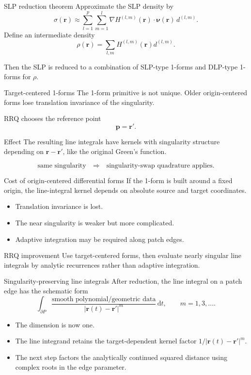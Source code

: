 \documentclass[aspectratio=169,11pt]{beamer}
\newcommand{\dd}{\,\mathrm d}
\newcommand{\rvec}{\bm{r}}
\newcommand{\rp}{\bm{r}'}
\newcommand{\nuvec}{\bm{\nu}}
\begin{document}
\begin{frame}{SLP reduction theorem}
\small
Approximate the SLP density by
\[
  \sigma(\rvec)
  \approx
  \sum_{l=1}^p\sum_{m=1}^l
  \nabla H^{(l,m)}(\rvec)\cdot\nuvec(\rvec)\,d^{(l,m)}.
\]
Define an intermediate density
\[
  \rho(\rvec)=\sum_{l,m}H^{(l,m)}(\rvec)d^{(l,m)}.
\]

Then the SLP is reduced to a combination of SLP-type 1-forms and DLP-type
1-forms for $\rho$.
\end{frame}

\begin{frame}{Target-centered 1-forms}
\small
The 1-form primitive is not unique. Older origin-centered forms lose translation
invariance of the singularity.

RRQ chooses the reference point
\[
  \bm p=\rp.
\]

\begin{block}{Effect}
The resulting line integrals have kernels with singularity structure depending
on $\rvec-\rp$, like the original Green's function.
\end{block}
\[
  \text{same singularity}
  \quad\Longrightarrow\quad
  \text{singularity-swap quadrature applies.}
\]
\end{frame}

\begin{frame}{Cost of origin-centered differential forms}
\small
If the 1-form is built around a fixed origin, the line-integral kernel depends on
absolute source and target coordinates.

\begin{itemize}
  \item Translation invariance is lost.
  \item The near singularity is weaker but more complicated.
  \item Adaptive integration may be required along patch edges.
\end{itemize}

\begin{block}{RRQ improvement}
Use target-centered forms, then evaluate nearly singular line integrals by
analytic recurrences rather than adaptive integration.
\end{block}
\end{frame}

\begin{frame}{Singularity-preserving line integrals}
\small
After reduction, the line integral on a patch edge has the schematic form
\[
  \int_{\partial P}
  \frac{\text{smooth polynomial/geometric data}}
       {|\rvec(t)-\rp|^m}\dd t,
  \qquad m=1,3,\ldots.
\]

\begin{itemize}
  \item The dimension is now one.
  \item The line integrand retains the target-dependent kernel factor
  $1/|\rvec(t)-\rp|^m$.
  \item The next step factors the analytically continued squared distance using
  complex roots in the edge parameter.
\end{itemize}
\end{frame}
\end{document}
